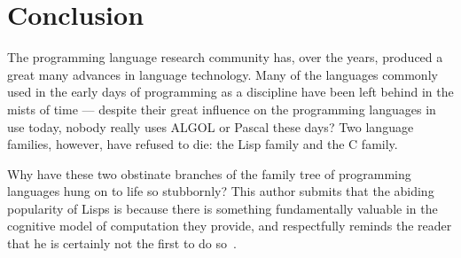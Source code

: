 \documentclass[11pt,a4paper]{article}
\theoremstyle{break}
\begin{document}
%
%
%

\vspace*{-.1in}
\section{Conclusion}
\label{sec:conclusion}
\vspace*{-.1in}

The programming language research community has, over the years, produced a great many advances in language technology. Many of the languages commonly used in the early days of programming as a discipline have been left behind in the mists of time --- despite their great influence on the programming languages in use today, nobody really uses ALGOL or Pascal these days? Two language families, however, have refused to die: the Lisp family and the C family.

Why have these two obstinate branches of the family tree of programming languages hung on to life so stubbornly? This author submits that the abiding popularity of Lisps is because there is something fundamentally valuable in the cognitive model of computation they provide, and respectfully reminds the reader that he is certainly not the first to do so~\cite{sicp,raymond2003become}.
\end{document}
